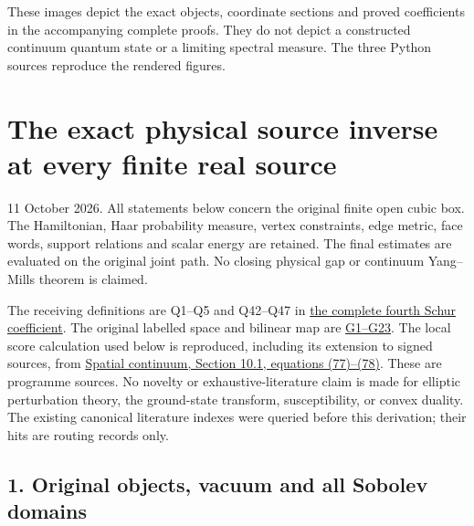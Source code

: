 \documentclass[11pt]{article}
\begin{document}
These images depict the exact objects, coordinate sections and proved coefficients in the accompanying complete proofs. They do not depict a constructed continuum quantum state or a limiting spectral measure. The three Python sources reproduce the rendered figures.
\clearpage
\section*{The exact physical source inverse at every finite real source}

11 October 2026. All statements below concern the original finite open cubic box. The Hamiltonian, Haar probability measure, vertex constraints, edge metric, face words, support relations and scalar energy are retained. The final estimates are evaluated on the original joint path. No closing physical gap or continuum Yang–Mills theorem is claimed.

The receiving definitions are Q1–Q5 and Q42–Q47 in \href{https://github.com/KokunoYumeto/yang-mills-interacting-workbench/blob/44548a167319316397e6874d8b2fc8f1d3491137/yang-mills/continuations/20261011-central-signs-shrinking-window/fourth_return/FOURTH_SCHUR_COEFFICIENT.md}{the complete fourth Schur coefficient}. The original labelled space and bilinear map are \href{https://github.com/KokunoYumeto/yang-mills-interacting-workbench/blob/fa79faff2cd697e16cfa3a7953f36810c22c8922/yang-mills/continuations/20260915-gauge-native-band/RESEARCH_NOTE.md}{G1–G23}. The local score calculation used below is reproduced, including its extension to signed sources, from \href{https://github.com/KokunoYumeto/yang-mills-interacting-workbench/blob/7d5681ed53835433a5fb72d880b6292832f2efbf/yang-mills/continuations/20260930-s6-ns-moment-map-bridge/sources/spatial/spatial_continuum.tex#L1414}{Spatial continuum, Section 10.1, equations (77)–(78)}. These are programme sources. No novelty or exhaustive-literature claim is made for elliptic perturbation theory, the ground-state transform, susceptibility, or convex duality. The existing canonical literature indexes were queried before this derivation; their hits are routing records only.

\subsection*{1. Original objects, vacuum and all Sobolev domains}
\end{document}
